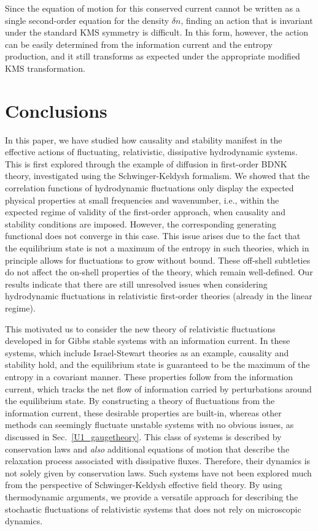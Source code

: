 \documentclass[aps,prd,nofootinbib,amsmath,amssymb,showpacs,longbibliography,singlecolumn,superscriptaddress,notitlepage]{revtex4-1}
\theoremstyle{plain}
\theoremstyle{definition}
\begin{document}
Since the equation of motion for this conserved current cannot be written as a single second-order equation for the density $\delta n$, finding an action that is invariant under the standard KMS symmetry is difficult. In this form, however, the action can be easily determined from the information current and the entropy production, and it still transforms as expected under the appropriate modified KMS transformation.


\section{Conclusions}
\label{conclusions}

In this paper, we have studied how causality and stability manifest in the effective actions of fluctuating, relativistic, dissipative hydrodynamic systems. This is first explored through the example of diffusion in first-order BDNK theory, investigated using the Schwinger-Keldysh formalism. We showed that the correlation functions of hydrodynamic fluctuations only display the expected physical properties at small frequencies and wavenumber,
i.e., within the expected regime of validity of the first-order approach, when causality and stability conditions are imposed. However, the corresponding generating functional does not converge in this case. This issue arises due to the fact that the equilibrium state is not a maximum of the entropy in such theories, which in principle allows for fluctuations to grow without bound. These off-shell subtleties do not affect the on-shell properties of the theory, which remain well-defined. Our results indicate that there are still unresolved issues when considering hydrodynamic fluctuations in relativistic first-order theories (already in the linear regime).  


This motivated us to consider the new theory of relativistic fluctuations developed in \cite{Mullins:2023tjg} for Gibbs stable systems with an information current. In these systems, which include Israel-Stewart theories as an example, causality and stability hold, and the equilibrium state is guaranteed to be the maximum of the entropy in a covariant manner. These properties follow from the information current, which tracks the net flow of information carried by perturbations around the equilibrium state. By constructing a theory of fluctuations from the information current, these desirable properties are built-in, whereas other methods can seemingly fluctuate unstable systems with no obvious issues, as discussed in Sec.\ \ref{U1_gaugetheory}. This class of systems is described by conservation laws and \emph{also} additional equations of motion that describe the relaxation process associated with dissipative fluxes. Therefore, their dynamics is not solely given by conservation laws. Such systems have not been explored much from the perspective of Schwinger-Keldysh effective field theory. By using thermodynamic arguments, we provide a versatile approach for describing the stochastic fluctuations of relativistic systems that does not rely on microscopic dynamics.
\end{document}
